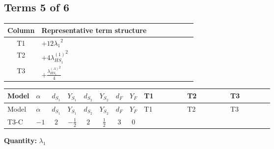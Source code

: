 \documentclass[8pt]{article}
\begin{document}
\begin{landscape}
\subsection*{Terms 5 of 6}
\begin{center}
\begin{tabular}{@{}c >{\raggedright\arraybackslash}p{0.82\linewidth}@{}}
\toprule
Column & Representative term structure \\
\midrule
T1 & \(\displaystyle +12 {\lambda_1}^2\) \\
\midrule
T2 & \(\displaystyle +4 {\lambda_{HS_1}^{(1)}}^2\) \\
\midrule
T3 & \(\displaystyle +\frac{{\lambda_{HS_1}^{(A)}}^2}{4}\) \\
\midrule
\bottomrule
\end{tabular}
\end{center}
\smallskip
\tiny
\begin{longtable}{@{}llcccccc >{\raggedright\arraybackslash}p{0.21\linewidth} >{\raggedright\arraybackslash}p{0.21\linewidth} >{\raggedright\arraybackslash}p{0.21\linewidth}@{}}
\toprule
Model & $\alpha$ & $d_{S_1}$ & $Y_{S_1}$ & $d_{S_2}$ & $Y_{S_2}$ & $d_F$ & $Y_F$ & T1 & T2 & T3 \\
\midrule
\endfirsthead
\toprule
Model & $\alpha$ & $d_{S_1}$ & $Y_{S_1}$ & $d_{S_2}$ & $Y_{S_2}$ & $d_F$ & $Y_F$ & T1 & T2 & T3 \\
\midrule
\endhead
T3-C & $-1$ & $2$ & $-\frac{1}{2}$ & $2$ & $\frac{1}{2}$ & $3$ & $0$ & \scriptsize\adjustbox{max width=\linewidth}{$\begin{gathered} +12 {\lambda_1}^2\end{gathered}$} & \scriptsize\adjustbox{max width=\linewidth}{$\begin{gathered} +4 {\lambda_{HS_1}^{(1)}}^2\end{gathered}$} & \scriptsize\adjustbox{max width=\linewidth}{$\begin{gathered} +\frac{{\lambda_{HS_1}^{(A)}}^2}{4}\end{gathered}$} \\
\midrule
\bottomrule
\end{longtable}
\clearpage
\noindent\textbf{Quantity: }$\lambda_1$\par\smallskip

\end{landscape}
\end{document}
